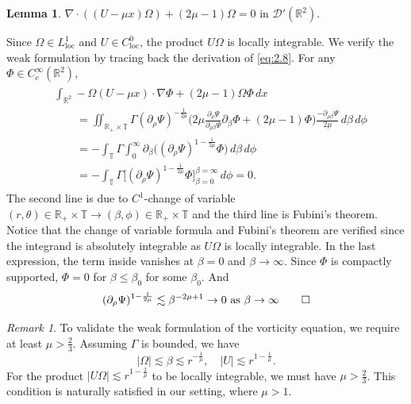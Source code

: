 \documentclass[11pt]{article}
\makeatletter
\renewenvironment{proof}[1][\proofname]{\par
  \vspace{-.7\topsep}%
  \pushQED{\qed}%
  \normalfont
  \topsep0pt \partopsep0pt %
  \trivlist
  \item[\hskip\labelsep
        \itshape
    #1\@addpunct{.}]\ignorespaces
}{%
  \popQED\endtrivlist\@endpefalse
  \addvspace{6pt plus 6pt} %
}
\theoremstyle{definition}
\newtheorem{lemma}[theorem]{Lemma}
\theoremstyle{remark}
\newtheorem*{remark}{Remark}
\numberwithin{equation}{section}
\newcommand{\mbb}{\mathbb}
\newcommand{\mcal}{\mathcal}
\newcommand{\R}{\mbb{R}}
\newcommand{\del}{\partial}
\newcommand{\grad}{\nabla}
\makeatother
\begin{document}
\begin{lemma} \label{lem:5.6}
$\grad \cdot ((U - \mu x) \Omega) + (2\mu - 1)\Omega = 0$ in $\mcal{D}'(\R^2)$.
\end{lemma}
\begin{proof}
Since $\Omega\in L^1_{\text{loc}}$ and $U \in C^0_{\text{loc}}$, the product $U \Omega$ is locally integrable. We verify the weak formulation by tracing back the derivation of \eqref{eq:2.8}. For any $\Phi\in C^\infty_c(\R^2)$, 
\begin{align} \label{eq:5.7} \begin{split}
& \int_{\R^2} -\Omega (U - \mu x) \cdot \grad \Phi + (2\mu - 1)\Omega \Phi \,dx \\
& \qquad = \iint_{\R_+ \times \mbb{T}} \Gamma (\del_\rho \Psi)^{-\frac{1}{2\mu}} \Big( 2\mu\frac{\del_\rho \Psi}{\del_{\rho\beta}\Psi} \del_\beta \Phi + (2\mu - 1)\Phi \Big) \frac{-\del_{\rho\beta}\Psi}{2\mu} \,d\beta\,d\phi \\
& \qquad = -\int_{\mbb{T}} \Gamma \int_{0}^\infty \del_\beta \Big( (\del_\rho \Psi)^{1-\frac{1}{2\mu}} \Phi \Big) \,d\beta \,d\phi \\
&\qquad = -\int_{\mbb{T}} \Gamma \bigg[(\del_\rho \Psi)^{1- \frac{1}{2\mu}} \Phi \bigg]_{\beta = 0}^{\beta = \infty} \,d\phi = 0.
\end{split}\end{align}
The second line is due to $C^1$-change of variable $(r,\theta)\in \R_+ \times \mbb{T} \to (\beta,\phi) \in \R_+ \times \mbb{T}$ and the third line is Fubini's theorem. Notice that the change of variable formula and Fubini's theorem are verified since the integrand is absolutely integrable as $U\Omega$ is locally integrable. In the last expression, the term inside vanishes at $\beta = 0$ and $\beta \to \infty$. Since $\Phi$ is compactly supported, $\Phi = 0$ for $\beta \leq \beta_0$ for some $\beta_0$. And
\[ (\del_\rho \Psi)^{1 - \frac{1}{2\mu}} \lesssim \beta^{-2\mu + 1} \to 0~\text{as}~\beta\to\infty \qedhere\]
\end{proof}

\begin{remark}
To validate the weak formulation of the vorticity equation, we require at least $\mu > \frac{2}{3}$. Assuming $\Gamma$ is bounded, we have
\[|\Omega| \lesssim \beta \lesssim r^{-\frac{1}{\mu}}, \quad |U| \lesssim r^{1- \frac{1}{\mu}}.\]
For the product $|U\Omega| \lesssim r^{1 - \frac{2}{\mu}}$ to be locally integrable, we must have $\mu > \frac{2}{3}$. This condition is naturally satisfied in our setting, where $\mu > 1$.
\end{remark}
\end{document}
